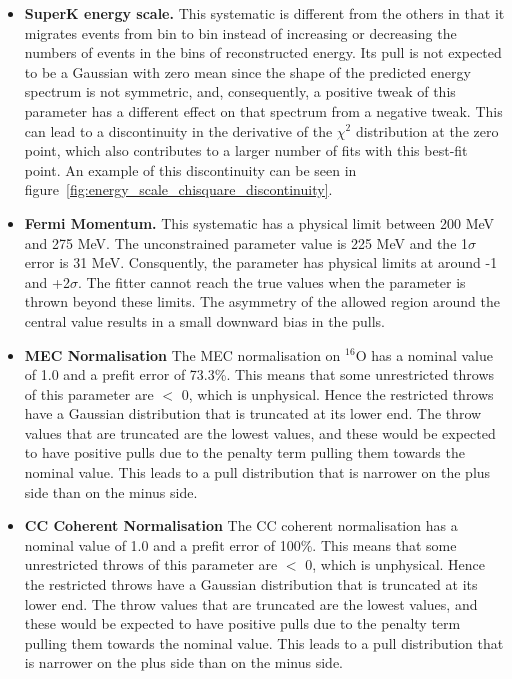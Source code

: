 \begin{itemize}
\item {\bf SuperK energy scale.}
  This systematic is different from the others in that it migrates events from bin to bin instead of increasing or decreasing the 
  numbers of events in the bins of reconstructed energy. Its pull is not expected to be a Gaussian with zero mean since the shape 
  of the predicted energy spectrum is not symmetric, and, consequently, a positive tweak of this parameter has a 
  different effect on that spectrum from a negative tweak.
  This can lead to a discontinuity in the derivative of the $\chi^2$ distribution
  at the zero point, which also contributes to a larger number of fits with this best-fit point.
  An example of this discontinuity can be seen in figure~\ref{fig:energy_scale_chisquare_discontinuity}.
\item {\bf Fermi Momentum.}
  This systematic has a physical limit between 200 MeV and 275 MeV.
  The unconstrained parameter value is 225 MeV and the 1$\sigma$ error is 31 MeV.
  Consquently, the parameter has physical limits at around -1 and +2$\sigma$.
  The fitter cannot reach the true values when the parameter is thrown beyond these limits.
  The asymmetry of the allowed region around the central value results in a small downward bias in the pulls.
\item {\bf MEC Normalisation}
  The MEC normalisation on $^{16}$O has a nominal value of 1.0 and a prefit error of 73.3\%. This means that some unrestricted throws of 
  this parameter are $<$ 0, which is unphysical. Hence the restricted throws have a Gaussian distribution that is truncated at its lower 
  end. The throw values that are truncated are the lowest values, and these would be expected to have positive pulls due to the penalty 
  term pulling them towards the nominal value. This leads to a pull distribution that is narrower on the plus side than on the minus side.    
\item {\bf CC Coherent Normalisation}
  The CC coherent normalisation has a nominal value of 1.0 and a prefit error of 100\%. This means that some unrestricted throws of
  this parameter are $<$ 0, which is unphysical. Hence the restricted throws have a Gaussian distribution that is truncated at its lower
  end. The throw values that are truncated are the lowest values, and these would be expected to have positive pulls due to the penalty
  term pulling them towards the nominal value. This leads to a pull distribution that is narrower on the plus side than on the minus side.

\end{itemize}
